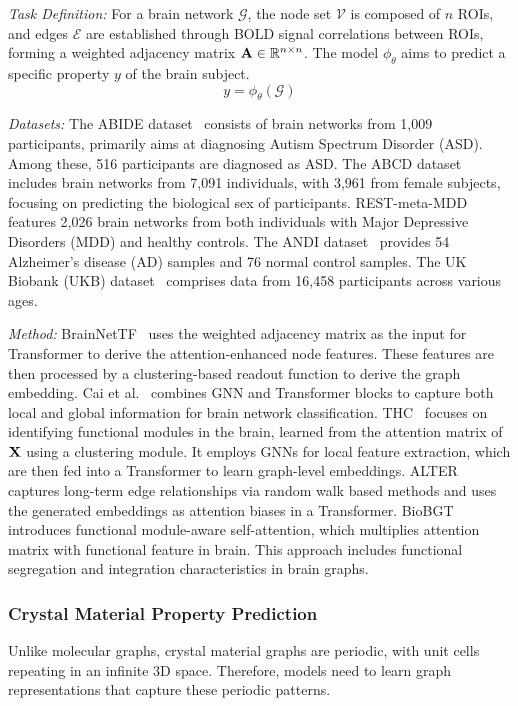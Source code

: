 \textit{Task Definition:}
For a brain network $\mathcal{G}$, the node set $\mathcal{V}$ is composed of $n$ ROIs, and edges $\mathcal{E}$ are established through BOLD signal correlations between ROIs, forming a weighted adjacency matrix $\mathbf{A} \in \mathbb{R}^{n \times n}$. 
The model $\phi_\theta$ aims to predict a specific property $y$ of the brain subject.
\begin{equation}
    y = \phi_\theta(\mathcal{G})
\end{equation}


\textit{Datasets:} The ABIDE dataset~\cite{craddock2013neuro} consists of brain networks from 1,009 participants, primarily aims at diagnosing Autism Spectrum Disorder (ASD). Among these, 516 participants are diagnosed as ASD. The ABCD dataset~\cite{casey2018adolescent} includes brain networks from 7,091 individuals, with 3,961 from female subjects, focusing on predicting the biological sex of participants.
REST-meta-MDD~\cite{yan2019reduced} features 2,026 brain networks from both individuals with Major Depressive Disorders (MDD) and healthy controls. The ANDI dataset~\cite{jack2008alzheimer} provides 54 Alzheimer's disease (AD) samples and 76 normal control samples. The UK Biobank (UKB) dataset~\cite{sudlow2015uk} comprises data from 16,458 participants across various ages.



\textit{Method:}
BrainNetTF~\cite{kan2022brain} uses the weighted adjacency matrix as the input for Transformer to derive the attention-enhanced node features.
These features are then processed by a clustering-based readout function to derive the graph embedding. Cai et al.~\cite{cai2022graph} combines GNN and Transformer blocks to capture both local and global information for brain network classification. THC~\cite{dai2023transformer} focuses on identifying functional modules in the brain, learned from the attention matrix of $\mathbf{X}$ using a clustering module. It employs GNNs for local feature extraction, which are then fed into a Transformer to learn graph-level embeddings. ALTER~\cite{yu2024longrange} captures long-term edge relationships via random walk based methods and uses the generated embeddings as attention biases in a Transformer. BioBGT~\cite{peng2025biologically} introduces functional module-aware self-attention, which multiplies attention matrix with functional feature in brain. This approach includes functional segregation and integration characteristics in brain graphs.

\subsubsection{\textbf{Crystal Material Property Prediction}}
Unlike molecular graphs, crystal material graphs are periodic, %
with unit cells repeating in an infinite 3D space. 
Therefore, models need to learn graph representations that capture these periodic patterns.

